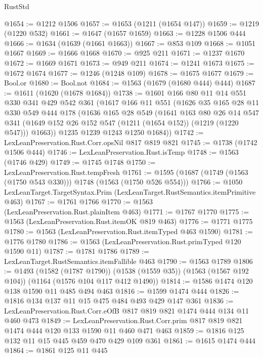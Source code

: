 \begin{lexlean}{RustStd}
\begin{coremodule}
@1654 := @1212 @1506
@1657 := @1653 (@1211 (@1654 @147))
@1659 := @1219 (@1220 @532)
@1661 := @1647 (@1657 @1659)
@1663 := @1228 @1506 @444
@1666 := @1634 (@1639 (@1661 @1663))
@1667 := @853 @109
@1668 := @1051 @1667
@1669 := @1666 @1668
@1670 := @925 @211
@1671 := @1237 @1670
@1672 := @1669 @1671
@1673 := @949 @211
@1674 := @1241 @1673
@1675 := @1672 @1674
@1677 := @1246 (@1248 @109)
@1678 := @1675 @1677
@1679 := Bool.or
@1680 := Bool.not
@1684 := @1563 (@1679 (@1680 @444) @444)
@1687 := @1611 (@1620 (@1678 @1684))
@1738 := @1601
    @166
    @80
    @11
    @14
    @551
    @330
    @341
    @429
    @542
    @361
    (@1617
      @166
      @11
      @551
      (@1626
        @35
        @165
        @28
        @11
        @330
        @549
        @444
        @178
        (@1636
          @165
          @28
          @549
          (@1641
            @163
            @80
            @26
            @14
            @547
            @341
            (@1649 @152 @26 @152 @547 (@1211 (@1654 @152)) (@1219 (@1220 @547)))
            @1663))
        @1235
        @1239
        @1243
        @1250
        @1684))
@1742 := LexLeanPreservation.Rust.Corr.opsNil @817 @819 @821
@1745 := @1738 (@1742 @1506 @444)
@1746 := LexLeanPreservation.Rust.isTemp
@1748 := @1563 (@1746 @429)
@1749 := @1745 @1748
@1750 := LexLeanPreservation.Rust.tempFresh
@1761 := @1595 (@1687 (@1749 (@1563 (@1750 @543 @330))) @1748 (@1563 (@1750 @526 @554)))
@1766 := @1050 LexLeanTarget.TargetSyntax.Prim (LexLeanTarget.RustSemantics.itemPrimitive @463)
@1767 := @1761 @1766
@1770 := @1563 (LexLeanPreservation.Rust.plainItem @463)
@1771 := @1767 @1770
@1775 := @1563 (LexLeanPreservation.Rust.itemOK @819 @463)
@1776 := @1771 @1775
@1780 := @1563 (LexLeanPreservation.Rust.itemTyped @463 @1590)
@1781 := @1776 @1780
@1786 := @1563 (LexLeanPreservation.Rust.primTyped @120 @1590 @11)
@1787 := @1781 @1786
@1789 := LexLeanTarget.RustSemantics.itemFallible @463
@1790 := @1563 @1789
@1806 := @1493
    (@1582 (@1787 @1790))
    (@1538 (@1559 @35))
    (@1563 (@1567 @192 @104))
    (@1164 (@1576 @104 @117 @412 @1490))
@1814 := @1586 @1474 @120 @138 @1590 @11 @485 @494 @463
@1816 := @1599 @1474 @444
@1826 := @1816 @134 @137 @11 @15 @475 @484 @493 @429 @147 @361
@1836 := LexLeanPreservation.Rust.Corr.eOfB @817 @819 @821 @1474 @444 @134 @11 @460 @473
@1849 := LexLeanPreservation.Rust.Corr.prim
    @817
    @819
    @821
    @1474
    @444
    @120
    @133
    @1590
    @11
    @460
    @471
    @463
@1859 := @1816 @125 @132 @11 @15 @445 @459 @470 @429 @109 @361
@1861 := @1615 @1474 @444
@1864 := @1861 @125 @11 @445

\end{coremodule}
\end{lexlean}
